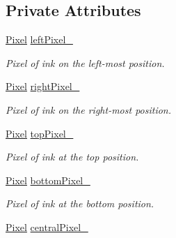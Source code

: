 \subsection*{Private Attributes}
\begin{CompactItemize}
\item 
\hypertarget{class_shape_812cd080959b320038aae54729831ce4}{
\hyperlink{_pixel_8hpp_535e59456e3e633842529cfa8ea103c4}{Pixel} \hyperlink{class_shape_812cd080959b320038aae54729831ce4}{leftPixel\_\-}}
\label{class_shape_812cd080959b320038aae54729831ce4}

\begin{CompactList}\small\item\em Pixel of ink on the left-most position. \item\end{CompactList}\item 
\hypertarget{class_shape_16adfccce492a7a0e34c5ade941c32fd}{
\hyperlink{_pixel_8hpp_535e59456e3e633842529cfa8ea103c4}{Pixel} \hyperlink{class_shape_16adfccce492a7a0e34c5ade941c32fd}{rightPixel\_\-}}
\label{class_shape_16adfccce492a7a0e34c5ade941c32fd}

\begin{CompactList}\small\item\em Pixel of ink on the right-most position. \item\end{CompactList}\item 
\hypertarget{class_shape_c6755e0dbd9d2eaf537e232fd003c918}{
\hyperlink{_pixel_8hpp_535e59456e3e633842529cfa8ea103c4}{Pixel} \hyperlink{class_shape_c6755e0dbd9d2eaf537e232fd003c918}{topPixel\_\-}}
\label{class_shape_c6755e0dbd9d2eaf537e232fd003c918}

\begin{CompactList}\small\item\em Pixel of ink at the top position. \item\end{CompactList}\item 
\hypertarget{class_shape_8277820de6ff8da989a0659f4e5d82d1}{
\hyperlink{_pixel_8hpp_535e59456e3e633842529cfa8ea103c4}{Pixel} \hyperlink{class_shape_8277820de6ff8da989a0659f4e5d82d1}{bottomPixel\_\-}}
\label{class_shape_8277820de6ff8da989a0659f4e5d82d1}

\begin{CompactList}\small\item\em Pixel of ink at the bottom position. \item\end{CompactList}\item 
\hypertarget{class_shape_f66f42ad506f5c8e31f1993111ea4878}{
\hyperlink{_pixel_8hpp_535e59456e3e633842529cfa8ea103c4}{Pixel} \hyperlink{class_shape_f66f42ad506f5c8e31f1993111ea4878}{centralPixel\_\-}}
\label{class_shape_f66f42ad506f5c8e31f1993111ea4878}


\end{CompactItemize}
